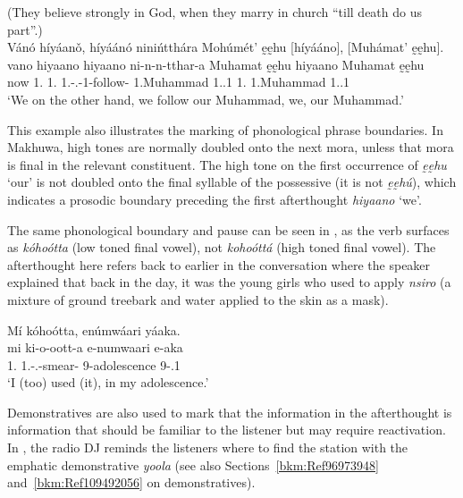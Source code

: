 \documentclass[output=paper]{langscibook}
\begin{document}
\ea
\label{bkm:Ref95913286}
(They believe strongly in God, when they marry in church “till death do us part”.)\\
Vánó híyáanǒ, híyáánó ninińtthára Mohúmét’ ḛḛhu [híyááno], [Muhámat’ ḛḛhu].\\
\gll
vano  hiyaano  hiyaano  ni-n-n-tthar-a  Muhamat  ḛḛhu     hiyaano  Muhamat  ḛḛhu \\
now  1\PL{}.\PRO{}  1\PL{}.\PRO{}  1\PL{}.\SM{}-\PRS{}.\CJ{}-1\OM{}-follow-\FV{}  1.Muhammad  1.\POSS{}.1\PL{}  1\PL{}.\PRO{}  1.Muhammad  1.\POSS{}.1\PL{} \\
\glt
‘We on the other hand, we follow our Muhammad, we, our Muhammad.’\\

\z

This example also illustrates the marking of phonological phrase boundaries. In Makhuwa, high tones are normally doubled onto the next mora, unless that mora is final in the relevant constituent. The high tone on the first occurrence of \textit{ḛḛhu} ‘our’ is not doubled onto the final syllable of the possessive (it is not \textit{ḛḛhú}), which indicates a prosodic boundary preceding the first afterthought \textit{hiyaano} ‘we’.

The same phonological boundary and pause can be seen in , as the verb surfaces as \textit{kóhoótta} (low toned final vowel), not \textit{kohoóttá} (high toned final vowel). The afterthought here refers back to earlier in the conversation where the speaker explained that back in the day, it was the young girls who used to apply \textit{nsiro} (a mixture of ground treebark and water applied to the skin as a mask).

\ea
\label{bkm:Ref95913831}
\label{bkm:Ref110501136}Mí kóhoótta, enúmwáari yáaka.\\
\gll
mi  ki-o-oott-a  e-numwaari  e-aka\\
1\SG{}.\PRO{}  1\SG{}.\SM{}-\PFV{}.\DJ{}-smear-\FV{}  9-adolescence  9-\POSS{}.1\SG{}\\
\glt
‘I (too) used (it), in my adolescence.’\\


\z

Demonstratives are also used to mark that the information in the afterthought is information that should be familiar to the listener but may require reactivation. In , the radio DJ reminds the listeners where to find the station with the emphatic demonstrative \textit{yoola} (see also Sections~\ref{bkm:Ref96973948} and~\ref{bkm:Ref109492056} on demonstratives).
\end{document}
